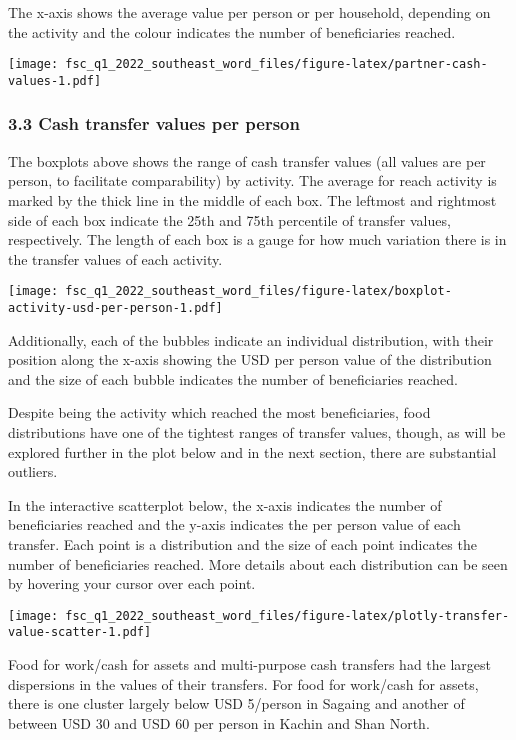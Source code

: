 \documentclass[
]{article}
\begin{document}
The x-axis shows the average value per person or per household,
depending on the activity and the colour indicates the number of
beneficiaries reached.

\texttt{[image: fsc\_q1\_2022\_southeast\_word\_files/figure-latex/partner-cash-values-1.pdf]}

\hypertarget{cash-transfer-values-per-person}{%
\subsubsection{3.3 Cash transfer values per
person}\label{cash-transfer-values-per-person}}

The boxplots above shows the range of cash transfer values (all values
are per person, to facilitate comparability) by activity. The average
for reach activity is marked by the thick line in the middle of each
box. The leftmost and rightmost side of each box indicate the 25th and
75th percentile of transfer values, respectively. The length of each box
is a gauge for how much variation there is in the transfer values of
each activity.

\texttt{[image: fsc\_q1\_2022\_southeast\_word\_files/figure-latex/boxplot-activity-usd-per-person-1.pdf]}

Additionally, each of the bubbles indicate an individual distribution,
with their position along the x-axis showing the USD per person value of
the distribution and the size of each bubble indicates the number of
beneficiaries reached.

Despite being the activity which reached the most beneficiaries, food
distributions have one of the tightest ranges of transfer values,
though, as will be explored further in the plot below and in the next
section, there are substantial outliers.

In the interactive scatterplot below, the x-axis indicates the number of
beneficiaries reached and the y-axis indicates the per person value of
each transfer. Each point is a distribution and the size of each point
indicates the number of beneficiaries reached. More details about each
distribution can be seen by hovering your cursor over each point.

\texttt{[image: fsc\_q1\_2022\_southeast\_word\_files/figure-latex/plotly-transfer-value-scatter-1.pdf]}

Food for work/cash for assets and multi-purpose cash transfers had the
largest dispersions in the values of their transfers. For food for
work/cash for assets, there is one cluster largely below USD 5/person in
Sagaing and another of between USD 30 and USD 60 per person in Kachin
and Shan North.
\end{document}
